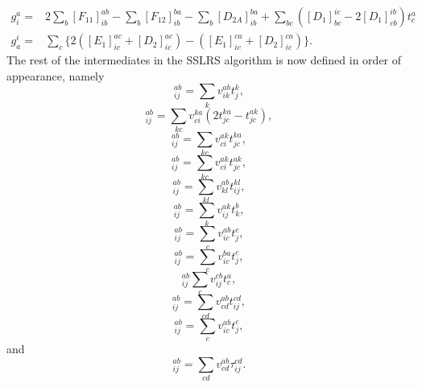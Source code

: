 \documentclass[a4paper,norsk,11pt,twoside]{report}
\begin{document}
\begin{align}
g_i^a = & 
2 \sum_b [F_{11}]_{ib}^{ab} 
- \sum_b [F_{12}]_{ib}^{ba}
- \sum_b [D_{2A}]_{ib}^{ba}
+ \sum_{bc} (
[D_1]_{bc}^{ic} - 2[D_1]_{cb}^{ib} ) t_c^a
\\
g_a^i = &
\sum_c \{2([E_1]_{ic}^{ac} + [D_2]_{ic}^{ac} )
- ([E_1]_{ic}^{ca} + [D_2]_{ic}^{ca}) \} .
\end{align}
The rest of the intermediates in the SSLRS algorithm is now defined in order of appearance, namely
\begin{equation}
[D_1]_{ij}^{ab} = \sum_k v_{ik}^{ab} t_j^k,
\end{equation}
\begin{equation}
[D_{2A}]_{ij}^{ab} = \sum_{kc}
v_{ci}^{ka} (2 t_{jc}^{ka} - t_{jc}^{ak}),
\end{equation}
\begin{equation}
[D_{2B}]_{ij}^{ab} = \sum_{kc}
v_{ci}^{ak} t_{jc}^{ka},
\end{equation}
\begin{equation}
[D_{2C}]_{ij}^{ab} = \sum_{kc}
v_{ci}^{ak} t_{jc}^{ak},
\end{equation}
\begin{equation}
[B_2]_{ij}^{ab} = \sum_{kl} v_{kl}^{ab} t_{ij}^{kl},
\end{equation}
\begin{equation}
[E_1^*]_{ij}^{ab} = \sum_k v_{ij}^{ak} t_k^b,
\end{equation}
\begin{equation}
[F_{12}]_{ij}^{ab} = \sum_c
v_{ic}^{ab} t_j^c,
\end{equation}
\begin{equation}
[F_{11}]_{ij}^{ab} = \sum_c v_{ic}^{ba} t_j^c,
\end{equation}
\begin{equation}
[E_{11}]_{ij}^{ab} \sum_c v_{ij}^{cb} t_c^a,
\end{equation}
\begin{equation}
[D_2]_{ij}^{ab} = \sum_{cd} v_{cd}^{ab} t_{ij}^{cd},
\end{equation}
\begin{equation}
[E_1]_{ij}^{ab} = \sum_c v_{ic}^{ab} t_j^c,
\end{equation}
and
\begin{equation}
[F_2]_{ij}^{ab} = \sum_{cd} v_{cd}^{ab} \tau_{ij}^{cd} .
\end{equation}
\end{document}

